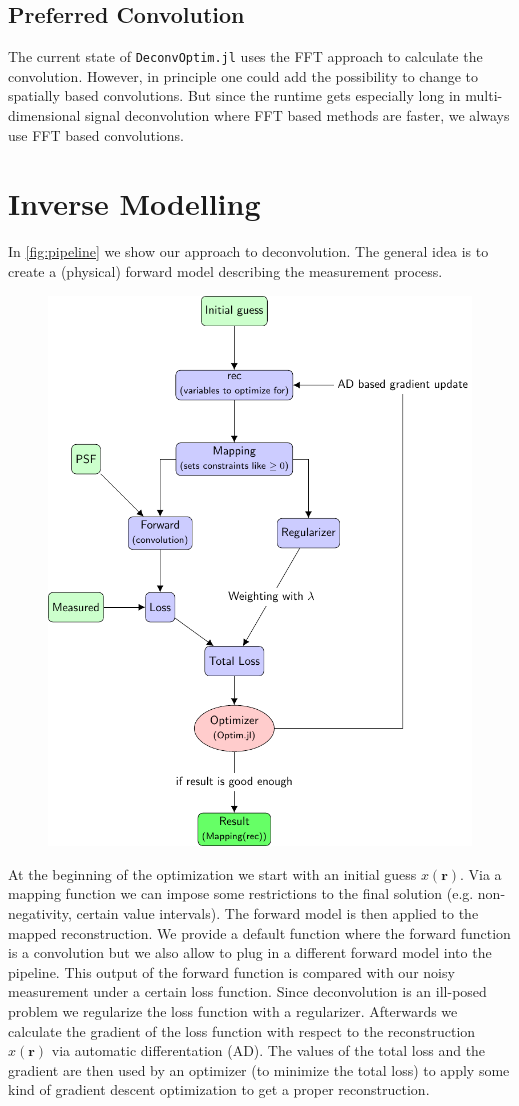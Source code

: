 \documentclass{juliacon}
\begin{document}
\subsection{Preferred Convolution}
The current state of \verb|DeconvOptim.jl| uses the FFT approach to calculate the convolution.
However, in principle one could add the possibility to change to spatially based convolutions.
But since the runtime gets especially long in multi-dimensional signal deconvolution where FFT based methods
are faster, we always use FFT based convolutions. 
   
\section{Inverse Modelling}
In \autoref{fig:pipeline} we show our approach to deconvolution.
The general idea is to create a (physical) forward model describing the measurement process.
\begin{figure}[h]
    \centering
    \includegraphics[width = .5\textwidth]{figures/pipeline.pdf}
    \caption{}
    \label{fig:pipeline}
\end{figure}

At the beginning of the optimization we start with an initial guess $x(\mathbf r)$. 
Via a mapping function we can impose some restrictions to the final solution (e.g. non-negativity, certain value intervals).
The forward model is then applied to the mapped reconstruction. We provide a default function where 
the forward function is a convolution but we also allow to plug in a different forward model into the pipeline.
This output of the forward function is compared
with our noisy measurement under a certain loss function.
Since deconvolution is an ill-posed problem we regularize the loss function with a regularizer.
Afterwards we calculate the gradient of the loss function with respect to the reconstruction $x(\mathbf r)$ via automatic differentation (AD).
The values of the total loss and the gradient are then used by an optimizer (to minimize the total loss) to apply some kind of gradient descent optimization to get a proper reconstruction.\\
\end{document}
